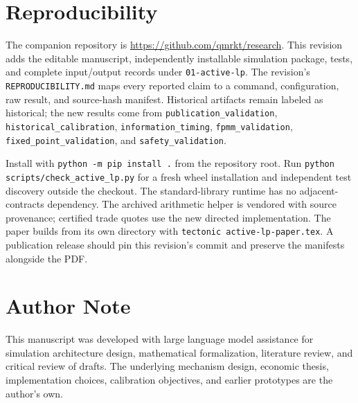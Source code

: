 \documentclass[10pt]{article}
\begin{document}
\section{Reproducibility}

The companion repository is \url{https://github.com/qmrkt/research}. This revision adds the editable manuscript, independently installable simulation package, tests, and complete input/output records under \texttt{01-active-lp}. The revision's \texttt{REPRODUCIBILITY.md} maps every reported claim to a command, configuration, raw result, and source-hash manifest. Historical artifacts remain labeled as historical; the new results come from \nolinkurl{publication_validation}, \nolinkurl{historical_calibration}, \nolinkurl{information_timing}, \nolinkurl{fpmm_validation}, \nolinkurl{fixed_point_validation}, and \nolinkurl{safety_validation}.

Install with \texttt{python -m pip install .} from the repository root. Run \nolinkurl{python scripts/check_active_lp.py} for a fresh wheel installation and independent test discovery outside the checkout. The standard-library runtime has no adjacent-contracts dependency. The archived arithmetic helper is vendored with source provenance; certified trade quotes use the new directed implementation. The paper builds from its own directory with \texttt{tectonic active-lp-paper.tex}. A publication release should pin this revision's commit and preserve the manifests alongside the PDF.

\section*{Author Note}

This manuscript was developed with large language model assistance for simulation architecture design, mathematical formalization, literature review, and critical review of drafts. The underlying mechanism design, economic thesis, implementation choices, calibration objectives, and earlier prototypes are the author's own.
\end{document}
